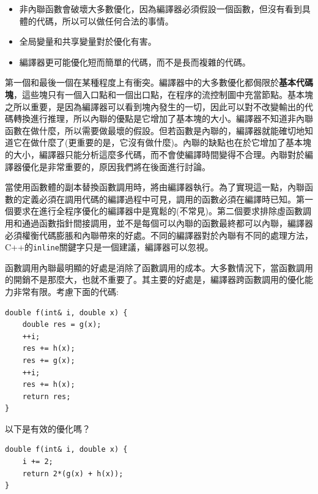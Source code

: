 \begin{itemize}
\item
非內聯函數會破壞大多數優化，因為編譯器必須假設一個函數，但沒有看到具體的代碼，所以可以做任何合法的事情。 

\item
全局變量和共享變量對於優化有害。

\item
編譯器更可能優化短而簡單的代碼，而不是長而複雜的代碼。
	
\end{itemize}

第一個和最後一個在某種程度上有衝突。編譯器中的大多數優化都侷限於\textbf{基本代碼塊}，這些塊只有一個入口點和一個出口點，在程序的流控制圖中充當節點。基本塊之所以重要，是因為編譯器可以看到塊內發生的一切，因此可以對不改變輸出的代碼轉換進行推理，所以內聯的優點是它增加了基本塊的大小。編譯器不知道非內聯函數在做什麼，所以需要做最壞的假設。但若函數是內聯的，編譯器就能確切地知道它在做什麼了(更重要的是，它沒有做什麼)。內聯的缺點也在於它增加了基本塊的大小，編譯器只能分析這麼多代碼，而不會使編譯時間變得不合理。內聯對於編譯器優化是非常重要的，原因我們將在後面進行討論。


當使用函數體的副本替換函數調用時，將由編譯器執行。為了實現這一點，內聯函數的定義必須在調用代碼的編譯過程中可見，調用的函數必須在編譯時已知。第一個要求在進行全程序優化的編譯器中是寬鬆的(不常見)。第二個要求排除虛函數調用和通過函數指針間接調用，並不是每個可以內聯的函數最終都可以內聯，編譯器必須權衡代碼膨脹和內聯帶來的好處。不同的編譯器對於內聯有不同的處理方法，C++的\texttt{inline}關鍵字只是一個建議，編譯器可以忽視。

函數調用內聯最明顯的好處是消除了函數調用的成本。大多數情況下，當函數調用的開銷不是那麼大，也就不重要了。其主要的好處是，編譯器跨函數調用的優化能力非常有限。考慮下面的代碼:

\begin{lstlisting}[style=styleCXX]
double f(int& i, double x) {
	double res = g(x);
	++i;
	res += h(x);
	res += g(x);
	++i;
	res += h(x);
	return res;
}
\end{lstlisting}

以下是有效的優化嗎？

\begin{lstlisting}[style=styleCXX]
double f(int& i, double x) {
	i += 2;
	return 2*(g(x) + h(x));
}
\end{lstlisting}

